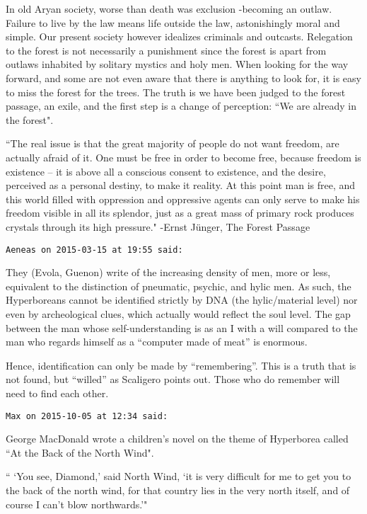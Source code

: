 \begin{footnotesize}
\begin{sffamily}
In old Aryan society, worse than death was exclusion -becoming an outlaw. Failure to live by the law means life outside the law, astonishingly moral and simple. Our present society however idealizes criminals and outcasts. Relegation to the forest is not necessarily a punishment since the forest is apart from outlaws inhabited by solitary mystics and holy men. When looking for the way forward, and some are not even aware that there is anything to look for, it is easy to miss the forest for the trees. The truth is we have been judged to the forest passage, an exile, and the first step is a change of perception: ``We are already in the forest".

``The real issue is that the great majority of people do not want freedom, are actually afraid of it. One must be free in order to become free, because freedom is existence – it is above all a conscious consent to existence, and the desire, perceived as a personal destiny, to make it reality. At this point man is free, and this world filled with oppression and oppressive agents can only serve to make his freedom visible in all its splendor, just as a great mass of primary rock produces crystals through its high pressure." -Ernst Jünger, The Forest Passage


\hfill

\texttt{Aeneas on 2015-03-15 at 19:55 said:}

They (Evola, Guenon) write of the increasing density of men, more or less, equivalent to the distinction of pneumatic, psychic, and hylic men. As such, the Hyperboreans cannot be identified strictly by DNA (the hylic/material level) nor even by archeological clues, which actually would reflect the soul level. The gap between the man whose self-understanding is as an I with a will compared to the man who regards himself as a “computer made of meat” is enormous.

Hence, identification can only be made by “remembering”. This is a truth that is not found, but “willed” as Scaligero points out. Those who do remember will need to find each other.

\hfill

\texttt{Max on 2015-10-05 at 12:34 said: }

George MacDonald wrote a children's novel on the theme of Hyperborea called ``At the Back of the North Wind".

`` `You see, Diamond,' said North Wind, `it is very difficult for me to get you to the back of the north wind, for that country lies in the very north itself, and of course I can't blow northwards.'"


\end{sffamily}
\end{footnotesize}
